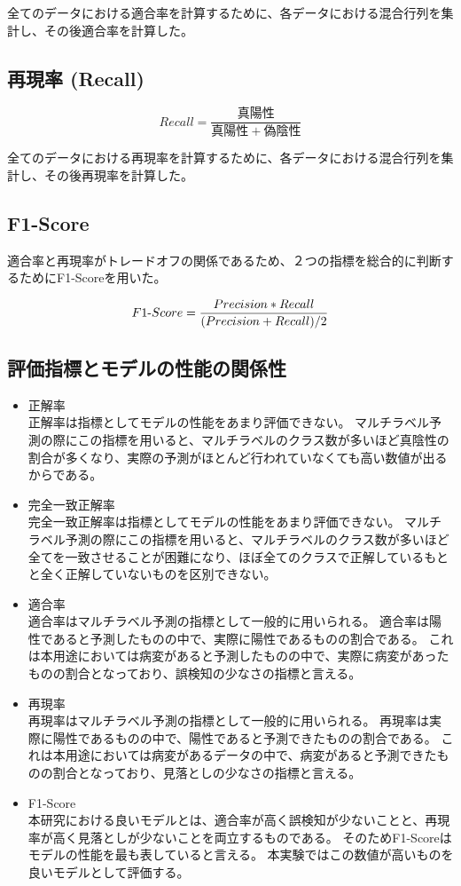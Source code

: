 全てのデータにおける適合率を計算するために、各データにおける混合行列を集計し、その後適合率を計算した。
\subsection{再現率 (Recall)}
\begin{equation}
Recall = \frac{真陽性}{真陽性+偽陰性}
\end{equation}

全てのデータにおける再現率を計算するために、各データにおける混合行列を集計し、その後再現率を計算した。
\subsection{F1-Score}
適合率と再現率がトレードオフの関係であるため、２つの指標を総合的に判断するためにF1-Scoreを用いた。

\begin{equation}
F1{\rm \mathchar"712D}Score = \frac{Precision * Recall}{(Precision + Recall) / 2}
\end{equation}

\subsection{評価指標とモデルの性能の関係性}
\begin{itemize}
    \item 正解率\\
        正解率は指標としてモデルの性能をあまり評価できない。
        マルチラベル予測の際にこの指標を用いると、マルチラベルのクラス数が多いほど真陰性の割合が多くなり、実際の予測がほとんど行われていなくても高い数値が出るからである。
    \item 完全一致正解率\\
        完全一致正解率は指標としてモデルの性能をあまり評価できない。
        マルチラベル予測の際にこの指標を用いると、マルチラベルのクラス数が多いほど全てを一致させることが困難になり、ほぼ全てのクラスで正解しているもとと全く正解していないものを区別できない。
    \item 適合率\\
        適合率はマルチラベル予測の指標として一般的に用いられる。
        適合率は陽性であると予測したものの中で、実際に陽性であるものの割合である。
        これは本用途においては病変があると予測したものの中で、実際に病変があったものの割合となっており、誤検知の少なさの指標と言える。
    \item 再現率\\
        再現率はマルチラベル予測の指標として一般的に用いられる。
        再現率は実際に陽性であるものの中で、陽性であると予測できたものの割合である。
        これは本用途においては病変があるデータの中で、病変があると予測できたものの割合となっており、見落としの少なさの指標と言える。
    \item F1-Score\\
        本研究における良いモデルとは、適合率が高く誤検知が少ないことと、再現率が高く見落としが少ないことを両立するものである。
        そのためF1-Scoreはモデルの性能を最も表していると言える。
        本実験ではこの数値が高いものを良いモデルとして評価する。
\end{itemize}

